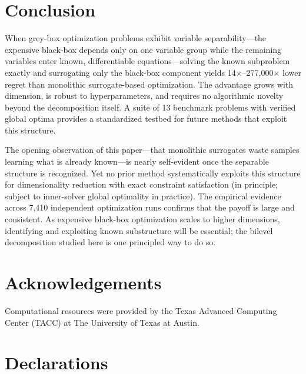 \documentclass[12pt,a4paper]{article}%
\theoremstyle{plain}%
\theoremstyle{remark}%
\theoremstyle{definition}%
\begin{document}
\section{Conclusion}\label{sec:conclusion}

When grey-box optimization problems exhibit variable separability---the expensive black-box depends only on one variable group while the remaining variables enter known, differentiable equations---solving the known subproblem exactly and surrogating only the black-box component yields 14$\times$--277{,}000$\times$ lower regret than monolithic surrogate-based optimization. The advantage grows with dimension, is robust to hyperparameters, and requires no algorithmic novelty beyond the decomposition itself. A suite of 13 benchmark problems with verified global optima provides a standardized testbed for future methods that exploit this structure.

The opening observation of this paper---that monolithic surrogates waste samples learning what is already known---is nearly self-evident once the separable structure is recognized. Yet no prior method systematically exploits this structure for dimensionality reduction with exact constraint satisfaction (in principle; subject to inner-solver global optimality in practice). The empirical evidence across 7{,}410 independent optimization runs confirms that the payoff is large and consistent. As expensive black-box optimization scales to higher dimensions, identifying and exploiting known substructure will be essential; the bilevel decomposition studied here is one principled way to do so.

\section*{Acknowledgements}

Computational resources were provided by the Texas Advanced Computing Center (TACC) at The University of Texas at Austin.

\section*{Declarations}
\end{document}
